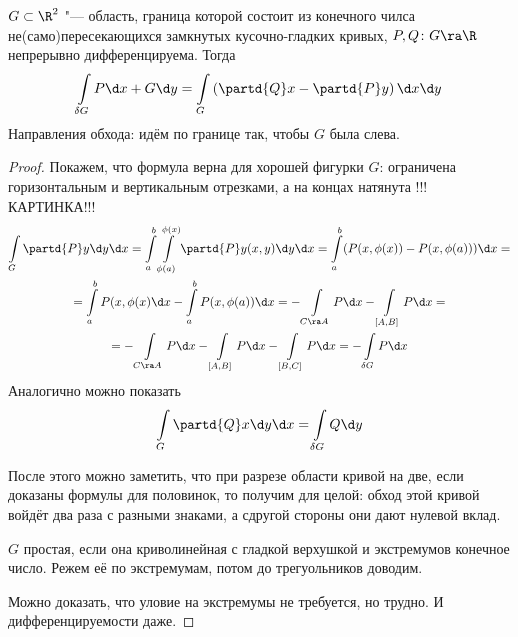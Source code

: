 \begin{theorem}
	$G \subset \R^2$ "--- область, граница которой состоит из конечного чилса не(само)пересекающихся замкнутых кусочно-гладких кривых,
	$P, Q\colon G \ra \R$ непрерывно дифференцируема.
	Тогда
	\[ \int\limits_{\delta G} P \d x + G \d y = \int\limits_G \left(\partd{Q}x - \partd{P}y\right) \d x \d y\]
	Направления обхода: идём по границе так, чтобы $G$ была слева.
\end{theorem}
\begin{proof}
	Покажем, что формула верна для хорошей фигурки $G$: ограничена горизонтальным и вертикальным отрезками, а на концах натянута !!!КАРТИНКА!!!
	\begin{gather*}
		\int\limits_G \partd{P}y \d y \d x
			= \int\limits_a^b \int\limits_{\phi(a)}^{\phi(x)} \partd{P}y(x, y) \d y \d x
			= \int\limits_a^b (P(x, \phi(x)) - P(x, \phi(a))) \d x = \\
			= \int\limits_a^b P(x, \phi(x) \d x - \int\limits_a^b P(x, \phi(a)) \d x
			= -\int\limits_{C\ra A} P \d x - \int\limits_{[A, B]} P \d x = \\
			= -\int\limits_{C\ra A} P \d x - \int\limits_{[A, B]} P \d x - \int\limits_{[B, C]} P \d x
			= -\int\limits_{\delta G} P \d x
	\end{gather*}
	Аналогично можно показать
	\[ \int\limits_G \partd{Q}x \d y \d x = \int\limits_{\delta G} Q \d y \]
	
	После этого можно заметить, что при разрезе области кривой на две, если доказаны формулы для половинок, то получим для целой:
	обход этой кривой войдёт два раза с разными знаками, а сдругой стороны они дают нулевой вклад.
	
	$G$ простая, если она криволинейная с гладкой верхушкой и экстремумов конечное число. 
	Режем её по экстремумам, потом до трегуольников доводим.

	Можно доказать, что уловие на экстремумы не требуется, но трудно. И дифференцируемости даже.
\end{proof}

